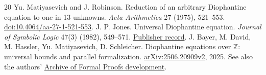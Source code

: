 \documentclass[11pt]{article}
\newcommand{\Z}{\mathbb Z}
\theoremstyle{remark}\newtheorem{remark}[theorem]{Remark}
\begin{document}
\begin{thebibliography}{20}
 Yu. Matiyasevich and J. Robinson.
Reduction of an arbitrary Diophantine equation to one in 13 unknowns.
\emph{Acta Arithmetica} 27 (1975), 521--553.
\href{https://doi.org/10.4064/aa-27-1-521-553}{doi:10.4064/aa-27-1-521-553}.
 J. P. Jones.
Universal Diophantine equation.
\emph{Journal of Symbolic Logic} 47(3) (1982), 549--571.
\href{https://www.cambridge.org/core/journals/journal-of-symbolic-logic/article/abs/universal-diophantine-equation/113EBF3D928DFC6011C52BECAE81A087}{Publisher record}.
 J. Bayer, M. David, M. Hassler, Yu. Matiyasevich, D. Schleicher.
Diophantine equations over $\Z$: universal bounds and parallel formalization.
\href{https://arxiv.org/abs/2506.20909v2}{arXiv:2506.20909v2}, 2025.
See also the authors' \href{https://isa-afp.org/entries/Diophantine_Universal_Pairs.html}{Archive of Formal Proofs development}.
\end{thebibliography}
\end{document}

